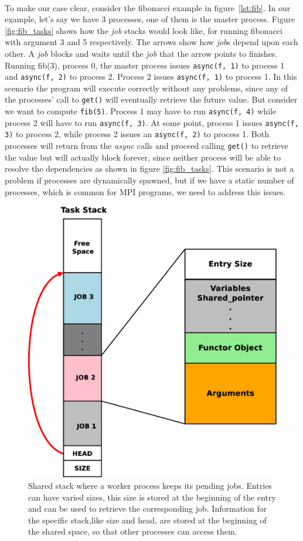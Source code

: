 \paragraph{}
To make our case clear, consider the fibonacci example in figure~\ref{lst:fib}.  
In our example, let's say we have
3 processes, one of them is the master process.  
Figure \ref{fig:fib_tasks} shows how the \emph{job} stacks would look like, for running fibonacci with argument 3 and 5
respectively. The arrows show how \emph{job}s depend upon each other.  A \emph{job} blocks and waits until the \emph{job}
that the arrow points to finishes. Running fib(3), process 0, the master process 
issues \texttt{async(f, 1)} to process 1 and \texttt{async(f, 2)} to process 2.  Process 2 issues \texttt{async(f, 1)} to 
process 1.  In this scenario the program will execute correctly without any
problems, since any of the processes' call to \texttt{get()}  will eventually retrieve the future value.  
But  consider we want to compute \texttt{fib(5)}.  Process 1 may have to run \texttt{async(f, 4)} while process 2 will have to run
\texttt{async(f, 3)}.  At some point, process 1 issues \texttt{async(f, 3)} to process 2, while process 2 issues an 
\texttt{async(f, 2)}
to process 1.  Both processes will return from the \emph{async} calls and proceed calling \texttt{get()} to retrieve the value
but will actually block forever, since neither process will be able to resolve the dependencies as shown in figure 
\ref{fig:fib_tasks}.  This scenario 
is not a problem if processes are dynamically spawned, but if we have a static number of processes, which is
common for MPI programs, we need to address this issues.  

\begin{figure}[!ht]
\center
\includegraphics[width=0.5\columnwidth]{figures/task_stack}
\caption{Shared stack where a worker process keeps its pending jobs.  Entries can have varied sizes, this
size is stored at the beginning of the entry and can be used to retrieve the corresponding job.  Information
for the specific stack,like size and head, are stored at the beginning of the shared space, so that other
processes can access them.}
\label{fig:task_stack}
\end{figure}

